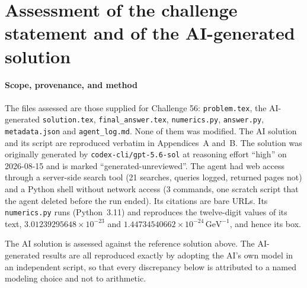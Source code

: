 \clearpage
\section*{Assessment of the challenge statement and of the AI-generated solution}

\paragraph*{Scope, provenance, and method}
The files assessed are those supplied for Challenge 56: \texttt{problem.tex}, the AI-generated \texttt{solution.tex}, \texttt{final\_answer.tex}, \texttt{numerics.py}, \texttt{answer.py}, \texttt{metadata.json} and \texttt{agent\_log.md}. None of them was modified. The AI solution and its script are reproduced verbatim in Appendices~A and~B. The solution was originally generated by \texttt{codex-cli/gpt-5.6-sol} at reasoning effort ``high'' on 2026-08-15 and is marked ``generated-unreviewed''. The agent had web access through a server-side search tool (21 searches, queries logged, returned pages not) and a Python shell without network access (3 commands, one scratch script that the agent deleted before the run ended). Its citations are bare URLs. Its \texttt{numerics.py} runs (Python~3.11) and reproduces the twelve-digit values of its text, $3.01239295648\times10^{-23}$ and $1.44734540662\times10^{-24}\,\mathrm{GeV}^{-1}$, and hence its box.

The AI solution is assessed against the reference solution above. The AI-generated results are all reproduced exactly by adopting the AI's own model in an independent script, so that every discrepancy below is attributed to a named modeling choice and not to arithmetic.

